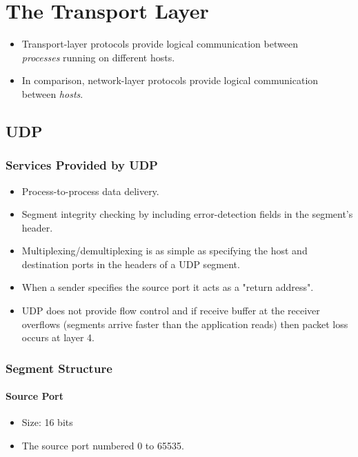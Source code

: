 \documentclass{article}
\begin{document}
\section{The Transport Layer}

\begin{itemize}
    \item Transport-layer protocols provide logical communication between \\ \emph{processes} running on different hosts.
    \item In comparison, network-layer protocols provide logical communication between \emph{hosts}.
\end{itemize}

\subsection{UDP}

\subsubsection{Services Provided by UDP}

\begin{itemize}
    \item Process-to-process data delivery.
    \item Segment integrity checking by including error-detection fields in the segment's header.
    \item Multiplexing/demultiplexing is as simple as specifying the host and destination ports in the headers of a UDP segment.
    \item When a sender specifies the source port it acts as a "return address".
    \item UDP does not provide flow control and if receive buffer at the receiver overflows (segments arrive faster than the application reads) then packet loss occurs at layer 4.
\end{itemize}

\subsubsection{Segment Structure}

\paragraph{Source Port}

\begin{itemize}
    \item Size: 16 bits 
    \item The source port numbered 0 to 65535.
\end{itemize}
\end{document}
